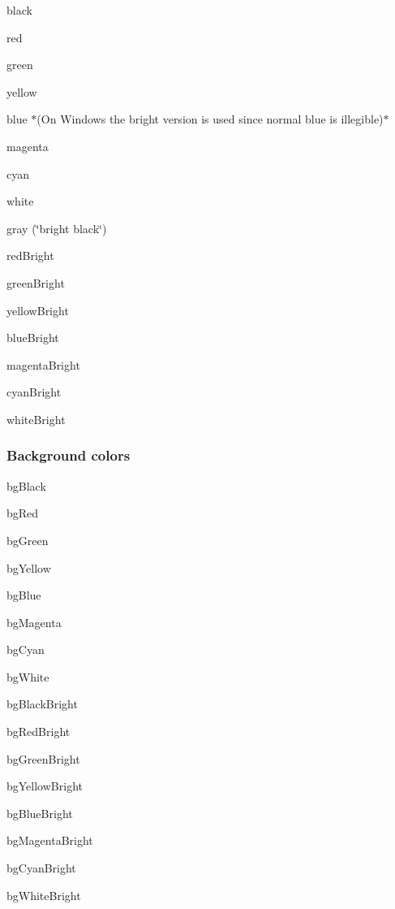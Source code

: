 \begin{DoxyItemize}
\item {\ttfamily black}
\item {\ttfamily red}
\item {\ttfamily green}
\item {\ttfamily yellow}
\item {\ttfamily blue} $\ast$(On Windows the bright version is used since normal blue is illegible)$\ast$
\item {\ttfamily magenta}
\item {\ttfamily cyan}
\item {\ttfamily white}
\item {\ttfamily gray} (\char`\"{}bright black\char`\"{})
\item {\ttfamily red\+Bright}
\item {\ttfamily green\+Bright}
\item {\ttfamily yellow\+Bright}
\item {\ttfamily blue\+Bright}
\item {\ttfamily magenta\+Bright}
\item {\ttfamily cyan\+Bright}
\item {\ttfamily white\+Bright}
\end{DoxyItemize}

\subsubsection*{Background colors}


\begin{DoxyItemize}
\item {\ttfamily bg\+Black}
\item {\ttfamily bg\+Red}
\item {\ttfamily bg\+Green}
\item {\ttfamily bg\+Yellow}
\item {\ttfamily bg\+Blue}
\item {\ttfamily bg\+Magenta}
\item {\ttfamily bg\+Cyan}
\item {\ttfamily bg\+White}
\item {\ttfamily bg\+Black\+Bright}
\item {\ttfamily bg\+Red\+Bright}
\item {\ttfamily bg\+Green\+Bright}
\item {\ttfamily bg\+Yellow\+Bright}
\item {\ttfamily bg\+Blue\+Bright}
\item {\ttfamily bg\+Magenta\+Bright}
\item {\ttfamily bg\+Cyan\+Bright}
\item {\ttfamily bg\+White\+Bright}
\end{DoxyItemize}

